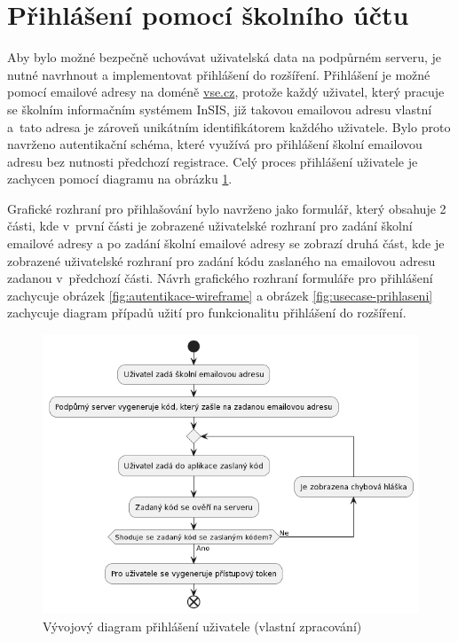 \section{Přihlášení pomocí školního účtu}

Aby bylo možné bezpečně uchovávat uživatelská data na podpůrném serveru, je nutné navrhnout a implementovat přihlášení do rozšíření. Přihlášení je možné pomocí emailové adresy na doméně \url{vse.cz}, protože každý uživatel, který pracuje se školním informačním systémem InSIS, již takovou emailovou adresu vlastní a~tato adresa je zároveň unikátním identifikátorem každého uživatele. Bylo proto navrženo autentikační schéma, které využívá pro přihlášení školní emailovou adresu bez nutnosti předchozí registrace.
Celý proces přihlášení uživatele je zachycen pomocí diagramu na obrázku \ref{fig:autentikace}.

Grafické rozhraní pro přihlašování bylo navrženo jako formulář, který obsahuje 2 části, kde v~první části je zobrazené uživatelské rozhraní pro zadání školní emailové adresy a po zadání školní emailové adresy se zobrazí druhá část, kde je zobrazené uživatelské rozhraní pro zadání kódu zaslaného na emailovou adresu zadanou v~předchozí části.
Návrh grafického rozhraní formuláře pro přihlášení zachycuje obrázek \ref{fig:autentikace-wireframe} a obrázek \ref{fig:usecase-prihlaseni} zachycuje diagram případů užití pro funkcionalitu přihlášení do rozšíření.

\begin{figure}[htbp!]\centering
    \includegraphics[width=\textwidth]{img/autentikace.png}
    \caption{Vývojový diagram přihlášení uživatele (vlastní zpracování)}
    \label{fig:autentikace}
\end{figure}


